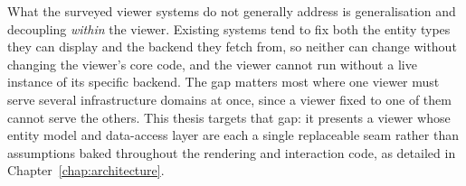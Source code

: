 What the surveyed viewer systems do not generally address is generalisation and decoupling \emph{within} the viewer. Existing systems tend to fix both the entity types they can display and the backend they fetch from, so neither can change without changing the viewer's core code, and the viewer cannot run without a live instance of its specific backend. The gap matters most where one viewer must serve several infrastructure domains at once, since a viewer fixed to one of them cannot serve the others. This thesis targets that gap: it presents a viewer whose entity model and data-access layer are each a single replaceable seam rather than assumptions baked throughout the rendering and interaction code, as detailed in Chapter~\ref{chap:architecture}.
